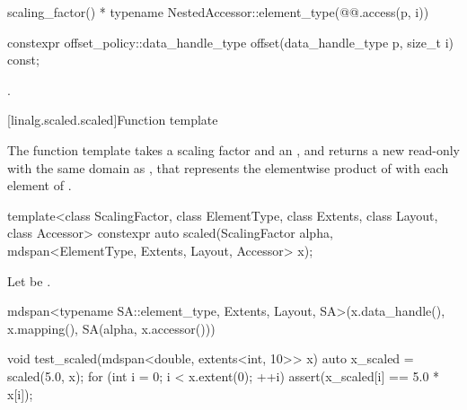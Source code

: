 \begin{itemdescr}
\pnum
\returns
\begin{codeblock}
scaling_factor() * typename NestedAccessor::element_type(@@.access(p, i))
\end{codeblock}
\end{itemdescr}

%
\begin{itemdecl}
constexpr offset_policy::data_handle_type offset(data_handle_type p, size_t i) const;
\end{itemdecl}

\begin{itemdescr}
\pnum
\returns
{}.
\end{itemdescr}

[linalg.scaled.scaled]{Function template }

\pnum
The  function template takes
a scaling factor  and
an  , and
returns a new read-only  with the same domain as ,
that represents the elementwise product of 
with each element of .

%
\begin{itemdecl}
  template<class ScalingFactor,
           class ElementType, class Extents, class Layout, class Accessor>
    constexpr auto scaled(ScalingFactor alpha, mdspan<ElementType, Extents, Layout, Accessor> x);
\end{itemdecl}

\begin{itemdescr}
\pnum
Let  be .

\pnum
\returns
\begin{codeblock}
mdspan<typename SA::element_type, Extents, Layout, SA>(x.data_handle(), x.mapping(),
                                                       SA(alpha, x.accessor()))
\end{codeblock}
\end{itemdescr}

\pnum
\begin{example}
\begin{codeblock}
void test_scaled(mdspan<double, extents<int, 10>> x)
{
  auto x_scaled = scaled(5.0, x);
  for (int i = 0; i < x.extent(0); ++i) {
    assert(x_scaled[i] == 5.0 * x[i]);
  }
}
\end{codeblock}
\end{example}

